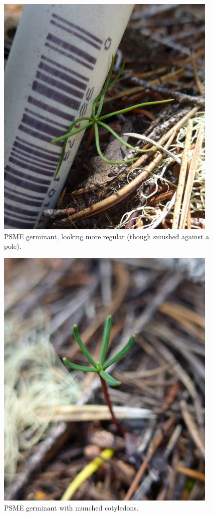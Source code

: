 \documentclass[11pt,letter]{article}
\begin{document}
\begin{figure}[h!]
\centering
\includegraphics[width=0.95\textwidth]{images/2020June17_Rainier210PSMEsm.jpg}
\caption{PSME germinant, looking more regular (though smushed against a pole).}
\label{fig:PSMEreg} 
\end{figure}


\begin{figure}[h!]
\centering
\includegraphics[width=0.95\textwidth]{images/2020June17_Rainier203_munchedPSMEsm.jpg}
\caption{PSME germinant with munched cotyledons.}
\label{fig:PSMEmunched} 
\end{figure}
\end{document}
